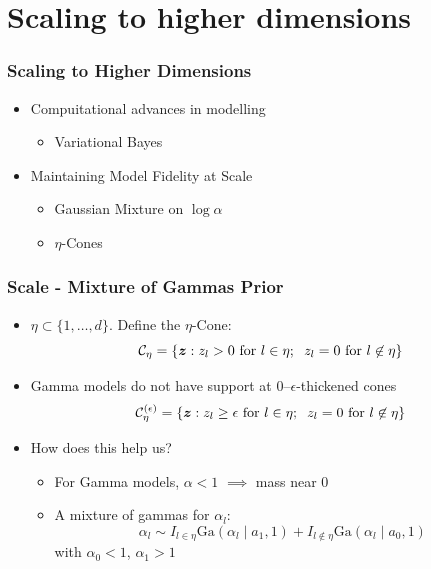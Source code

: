\documentclass[aspectratio=169]{beamer}
\begin{document}
\section[Scaling]{Scaling to higher dimensions}

\begin{frame}
  \frametitle{Scaling to Higher Dimensions}
  \begin{itemize}
    \item Compuitational advances in modelling
      \begin{itemize}
        \item Variational Bayes
      \end{itemize}
    \item Maintaining Model Fidelity at Scale
      \begin{itemize}
        \item Gaussian Mixture on $\log\alpha$
        \item $\eta$-Cones
      \end{itemize}
  \end{itemize}
\end{frame}

\begin{frame}
  \frametitle{Scale - Mixture of Gammas Prior}
  \begin{itemize}
    \item $\eta \subset \lbrace 1,\ldots,d\rbrace$.  Define the $\eta$-Cone:
      \begin{equation*}
        \mathcal{C}_{\eta} = \left\lbrace \bm{z} : z_l > 0 \text{ for }l\in\eta;
                              \hspace{0.2cm} z_l = 0 \text{ for }l\not\in\eta\right\rbrace
      \end{equation*}
    \pause
    \item Gamma models do not have support at 0--$\epsilon$-thickened cones
      \begin{equation*}
        \mathcal{C}_{\eta}^{(\epsilon)} = \left\lbrace \bm{z} : z_l \geq \epsilon
          \text{ for }l\in\eta; \hspace{0.2cm} z_l = 0 \text{ for }l\not\in\eta\right\rbrace
      \end{equation*}
    \pause
    \item How does this help us?
      \begin{itemize}
        \item For Gamma models, $\alpha < 1$ $\implies$ mass near 0
        \item A mixture of gammas for $\alpha_l$:
          \begin{equation*}
            \alpha_l \sim I_{l\in\eta}\text{Ga}(\alpha_l\mid a_1, 1)
                        + I_{l\not\in\eta}\text{Ga}(\alpha_l\mid a_0, 1)
          \end{equation*}
          with $\alpha_0 < 1$, $\alpha_1 > 1$
      \end{itemize}
  \end{itemize}
\end{frame}
\end{document}
